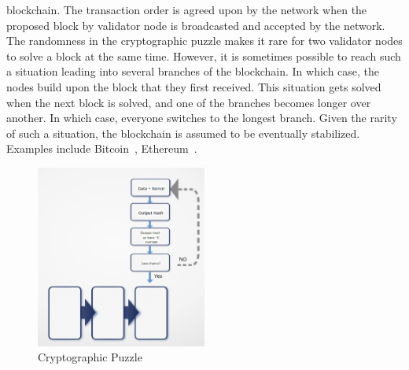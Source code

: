 blockchain. The transaction order is agreed upon by the network when the
proposed block by validator node is broadcasted and accepted by the network.
The randomness in the cryptographic puzzle makes it rare for two validator
nodes to solve a block at the same time.  However, it is sometimes possible to
reach such a situation leading into several branches of the blockchain. In
which case, the nodes build upon the block that they first received. This
situation gets solved when the next block is solved, and one of the branches
becomes longer over another. In which case, everyone switches to the longest
branch. Given the rarity of such a situation, the blockchain is assumed to be
eventually stabilized. Examples include Bitcoin~\cite{Bitcoin_Satoshi},
Ethereum~\cite{buterin2013ethereum}. 
\begin{figure}
	\begin{center}
	\includegraphics[width=0.5\textwidth]{Images/CryptographicPuzzle.eps}
	\caption{Cryptographic Puzzle}
	\label{fig:cryptographicPuzzle}
	\end{center}
\end{figure}
